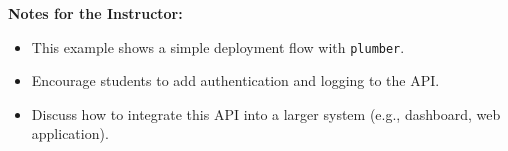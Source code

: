 \textbf{Notes for the Instructor:}
\begin{itemize}
  \item This example shows a simple deployment flow with \texttt{plumber}.
  \item Encourage students to add authentication and logging to the API.
  \item Discuss how to integrate this API into a larger system (e.g., dashboard, web application).
\end{itemize}